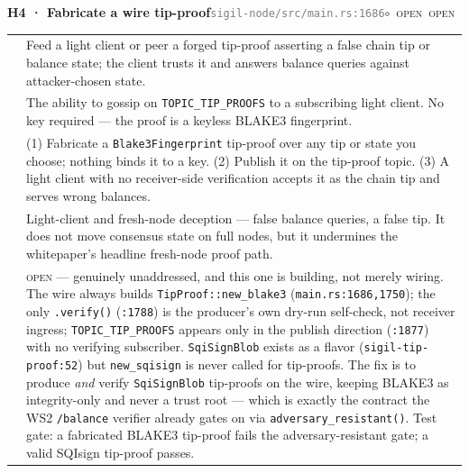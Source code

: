 \documentclass[10pt,a4paper]{article}
\makeatletter
\newcommand{\stO}{\textcolor{sigilamber}{$\circ$}~{\scriptsize\textcolor{sigilamber}{\textsc{open}}}}
\newcommand{\svMod}{{\scriptsize\textcolor{sigilblue}{\textsc{moderate}}}}
\newcommand{\mgOpen}{{\scriptsize\textcolor{sigilamber}{\textsc{open}}}}
\newcommand{\frow}[2]{{\footnotesize\textcolor{gray}{\textsc{#1}}}\;&\small #2\\}
\newenvironment{atkentry}[5]{%
\begin{tcolorbox}[enhanced,breakable,colback=white,colframe=slate,boxrule=0.6pt,arc=2pt,
  left=8pt,right=8pt,top=6pt,bottom=6pt,
  borderline west={3pt}{0pt}{sigilred!60!slate}]
{\small\textbf{#1 · #2}\hfill{\footnotesize\textcolor{gray}{\texttt{#3}}}\quad#4\quad#5}\\[4pt]
\begin{tabular}{@{}>{\raggedleft\arraybackslash}p{2.1cm}p{12.9cm}@{}}
}{%
\end{tabular}
\end{tcolorbox}\vspace{2pt}}
\makeatother
\begin{document}
\begin{atkentry}{H4}{Fabricate a wire tip-proof}{sigil-node/src/main.rs:1686}{\svMod}{\stO~\mgOpen}
\frow{goal}{Feed a light client or peer a forged tip-proof asserting a false chain tip or
balance state; the client trusts it and answers balance queries against attacker-chosen
state.}
\frow{preconditions}{The ability to gossip on \texttt{TOPIC\_TIP\_PROOFS} to a subscribing
light client. No key required — the proof is a keyless BLAKE3 fingerprint.}
\frow{steps}{(1) Fabricate a \texttt{Blake3Fingerprint} tip-proof over any tip or state you
choose; nothing binds it to a key. (2) Publish it on the tip-proof topic. (3) A light client
with no receiver-side verification accepts it as the chain tip and serves wrong balances.}
\frow{buys}{Light-client and fresh-node deception — false balance queries, a false tip. It
does not move consensus state on full nodes, but it undermines the whitepaper's headline
fresh-node proof path.}
\frow{defense}{\mgOpen{} — genuinely unaddressed, and this one is building, not merely
wiring. The wire always builds \texttt{TipProof::new\_blake3}
(\texttt{main.rs:1686,1750}); the only \texttt{.verify()} (\texttt{:1788}) is the producer's
own dry-run self-check, not receiver ingress; \texttt{TOPIC\_TIP\_PROOFS} appears only in
the publish direction (\texttt{:1877}) with no verifying subscriber. \texttt{SqiSignBlob}
exists as a flavor (\texttt{sigil-tip-proof:52}) but \texttt{new\_sqisign} is never called
for tip-proofs. The fix is to produce \emph{and} verify \texttt{SqiSignBlob} tip-proofs on
the wire, keeping BLAKE3 as integrity-only and never a trust root — which is exactly the
contract the WS2 \texttt{/balance} verifier already gates on via
\texttt{adversary\_resistant()}. Test gate: a fabricated BLAKE3 tip-proof fails the
adversary-resistant gate; a valid SQIsign tip-proof passes.}
\end{atkentry}
\end{document}

